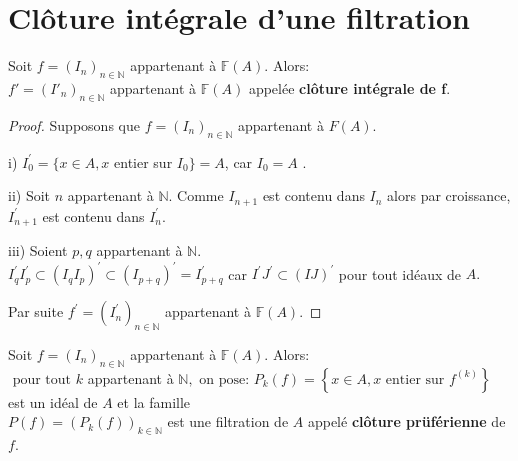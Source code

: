 \section{Clôture intégrale d'une filtration}
\begin{maproposition}
	Soit $f=(I_n)_{n\in \mathbb{N}} $ appartenant à $ \mathbb{F}(A).$ Alors:\\
	$f'=(I'_n)_{n\in \mathbb{N}} $ appartenant à $ \mathbb{F}(A)$ appelée \textbf{clôture intégrale de f}.
\end{maproposition}
\begin{proof}
	Supposons que $f=(I_{n})_{n\in \mathbb{N}}$ appartenant à $ F(A).$
	
	i) $I_{0}^{\prime }=\{x\in A,x$ entier sur $I_{0}\}=A$, car $I_{0}=A$ $.$
	
	ii) Soit $n$ appartenant à $ \mathbb{N}.$
	Comme $I_{n+1}$ est contenu dans $  I_{n}$ alors par croissance, $I_{n+1}^{\prime }$ est contenu dans $ I_{n}^{\prime }.$
	
	iii) Soient $p,q$ appartenant à $ \mathbb{N}.$ \\
	$I_{q}^{\prime }I_{p}^{\prime }\subset (I_{q}I_{p})^{\prime }\subset (I_{p+q})^{\prime }=I_{p+q}^{\prime }$ car $I^{\prime }J^{\prime }\subset (IJ)^{\prime }$ pour tout idéaux de $A.$
	
	Par suite $f^{\prime }=(I_{n}^{\prime })_{n\in \mathbb{N}}$ appartenant à $ \mathbb{F}(A).$
\end{proof}
\begin{moncorollaire}
	Soit $f=(I_n)_{n \in \mathbb{N}} $ appartenant à $ \mathbb{F}(A)$. Alors:\\
	$\text{ pour tout } k $ appartenant à $ \mathbb{N}, \text{ on pose: } P_k(f)=\left\{x \in A, x \text{ entier sur } f^{(k)}\right\}$ est un idéal de $A$ et la famille \\ $P(f)=(P_k(f))_{k \in \mathbb{N}}$ est une filtration de $A$ appelé \textbf{clôture prüférienne} de $f$.
\end{moncorollaire}
